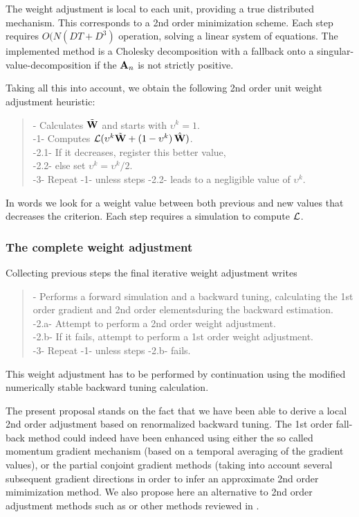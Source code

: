The weight adjustment is local to each unit, providing a true distributed mechanism. This corresponds to a 2nd order minimization scheme. Each step requires $O(N (D T + D^3)$ operation, solving a linear system of equations. The implemented method is a Cholesky decomposition with a fallback onto a singular-value-decomposition if the ${\bf A}_n$ is not strictly positive.

Taking all this into account, we obtain the following 2nd order unit weight adjustment heuristic:\begin{quotation}{\small 
{}- Calculates $\tilde{\bf W}$ and starts with $\upsilon^k = 1$.
\\-1- Computes ${\cal L}(\upsilon^k \tilde{\bf W} + (1 - \upsilon^k) \, \hat{\bf W})$.
\\\hspace{0.5cm} -2.1- If it decreases, register this better value, 
\\\hspace{0.5cm} -2.2- else set $\upsilon^k = \upsilon^k / 2$.
\\-3- Repeat -1- unless steps -2.2- leads to a negligible value of $\upsilon^k$.
}\end{quotation}
In words we look for a weight value between both previous and new values that decreases the criterion. Each step requires a simulation to compute ${\cal L}$.

\subsubsection*{The complete weight adjustment}

Collecting previous steps the final iterative weight adjustment writes\begin{quotation}{\small 
{}- Performs a forward simulation and a backward tuning, calculating the 1st order gradient and 2nd order elementsduring the backward estimation.
\\\hspace{0.5cm} -2.a- Attempt to perform a 2nd order weight adjustment.
\\\hspace{0.5cm} -2.b- If it fails, attempt to perform a 1st order weight adjustment.
\\-3- Repeat -1- unless steps -2.b- fails.
}\end{quotation}
This weight adjustment has to be performed by continuation using the modified numerically stable backward tuning calculation.

The present proposal stands on the fact that we have been able to derive a local 2nd order adjustment based on renormalized backward tuning. The 1st order fall-back method could indeed have been enhanced using either the so called momentum gradient mechanism (based on a temporal averaging of the gradient values), or the partial conjoint gradient methods (taking into account several subsequent gradient directions in order to infer an approximate 2nd order mimimization method. We also propose here an alternative to 2nd order adjustment methods such as \cite{martens_learning_2016} or other methods reviewed in \cite{Goodfellow2016Deep}.

